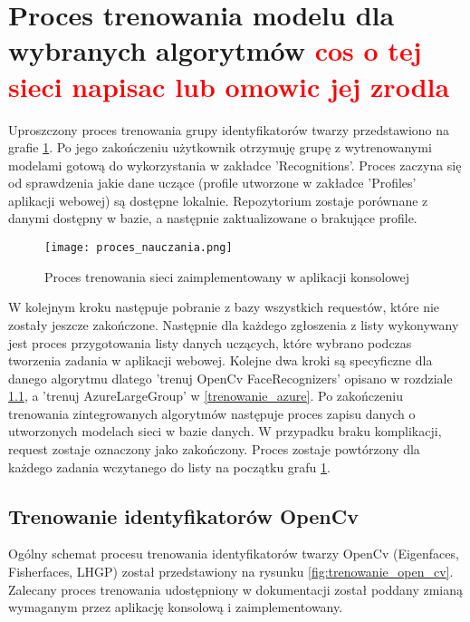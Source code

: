 \section{Proces trenowania modelu dla wybranych algorytmów \textcolor{red}{cos o tej sieci napisac lub omowic jej zrodla}}
Uproszczony proces trenowania grupy identyfikatorów twarzy przedstawiono na grafie \ref{fig:trenowanie_proces}. Po jego zakończeniu użytkownik otrzymuję grupę z wytrenowanymi modelami gotową do wykorzystania w zakładce 'Recognitions'.
Proces zaczyna się od sprawdzenia jakie dane uczące (profile utworzone w zakładce 'Profiles' aplikacji webowej) są dostępne lokalnie. Repozytorium zostaje porównane z danymi dostępny w bazie, a następnie zaktualizowane o brakujące profile.
\begin{figure}[H]
	\centering
	\texttt{[image: proces\_nauczania.png]}
	\caption{Proces trenowania sieci zaimplementowany w aplikacji konsolowej}
	\label{fig:trenowanie_proces}
\end{figure}
W kolejnym kroku następuje pobranie z bazy wszystkich requestów, które nie zostały jeszcze zakończone. Następnie dla każdego zgłoszenia z listy wykonywany jest proces przygotowania listy danych uczących, które wybrano podczas tworzenia zadania w aplikacji webowej. Kolejne dwa kroki są specyficzne dla danego algorytmu dlatego 'trenuj OpenCv FaceRecognizers' opisano w rozdziale \ref{trenowanie_open_cv}, a 'trenuj AzureLargeGroup' w \ref{trenowanie_azure}. Po zakończeniu trenowania zintegrowanych algorytmów następuje proces zapisu danych o utworzonych modelach sieci w bazie danych.
W przypadku braku komplikacji, request zostaje oznaczony jako zakończony. Proces zostaje powtórzony dla każdego zadania wczytanego do listy na początku grafu \ref{fig:trenowanie_proces}.

\subsection{Trenowanie identyfikatorów OpenCv} \label{trenowanie_open_cv}
Ogólny schemat procesu trenowania identyfikatorów twarzy OpenCv (Eigenfaces, Fisherfaces, LHGP) został przedstawiony na rysunku \ref{fig:trenowanie_open_cv}. Zalecany proces trenowania udostępniony w dokumentacji \cite{opencv_doc} został poddany zmianą wymaganym przez aplikację konsolową i zaimplementowany.

